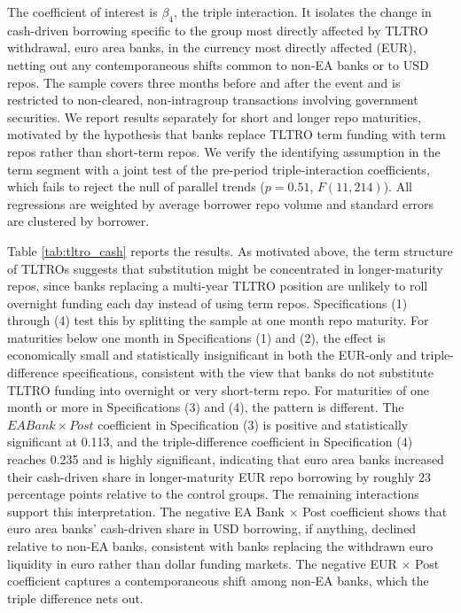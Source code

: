 \documentclass[english, 12pt, oneside]{article}
\begin{document}
The coefficient of interest is $\beta_4$, the triple interaction. It isolates the change in cash-driven borrowing specific to the group most directly affected by TLTRO withdrawal, euro area banks, in the currency most directly affected (EUR), netting out any contemporaneous shifts common to non-EA banks or to USD repos. The sample covers three months before and after the event and is restricted to non-cleared, non-intragroup transactions involving government securities. We report results separately for short and longer repo maturities, motivated by the hypothesis that banks replace TLTRO term funding with term repos rather than short-term repos. We verify the identifying assumption in the term segment with a joint test of the pre-period triple-interaction coefficients, which fails to reject the null of parallel trends ($p = 0.51$, $F(11, 214)$). All regressions are weighted by average borrower repo volume and standard errors are clustered by borrower.

Table \ref{tab:tltro_cash} reports the results. As motivated above, the term structure of TLTROs suggests that substitution might be concentrated in longer-maturity repos, since banks replacing a multi-year TLTRO position are unlikely to roll overnight funding each day instead of using term repos. Specifications (1) through (4) test this by splitting the sample at one month repo maturity. For maturities below one month in Specifications (1) and (2), the effect is economically small and statistically insignificant in both the EUR-only and triple-difference specifications, consistent with the view that banks do not substitute TLTRO funding into overnight or very short-term repo. For maturities of one month or more in Specifications (3) and (4), the pattern is different. The $EA Bank \times Post$ coefficient in Specification (3) is positive and statistically significant at 0.113, and the triple-difference coefficient in Specification (4) reaches 0.235 and is highly significant, indicating that euro area banks increased their cash-driven share in longer-maturity EUR repo borrowing by roughly 23 percentage points relative to the control groups.
The remaining interactions support this interpretation. The negative EA Bank $\times$ Post coefficient shows that euro area banks' cash-driven share in USD borrowing, if anything, declined relative to non-EA banks, consistent with banks replacing the withdrawn euro liquidity in euro rather than dollar funding markets. The negative EUR $\times$ Post coefficient captures a contemporaneous shift among non-EA banks, which the triple difference nets out.
\end{document}
